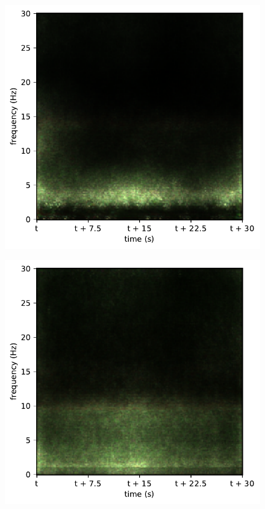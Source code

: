 \begin{subfigure}{.16\textwidth}
  \centering
  \includegraphics[width=1\linewidth]{./pics/class_master_4}
  \caption{}
  \label{fig_1_25}
\end{subfigure}%
\begin{subfigure}{.16\textwidth}
  \centering
  \includegraphics[width=1\linewidth]{./pics/class_master_5}
  \caption{}
  \label{fig_1_26}
\end{subfigure}


